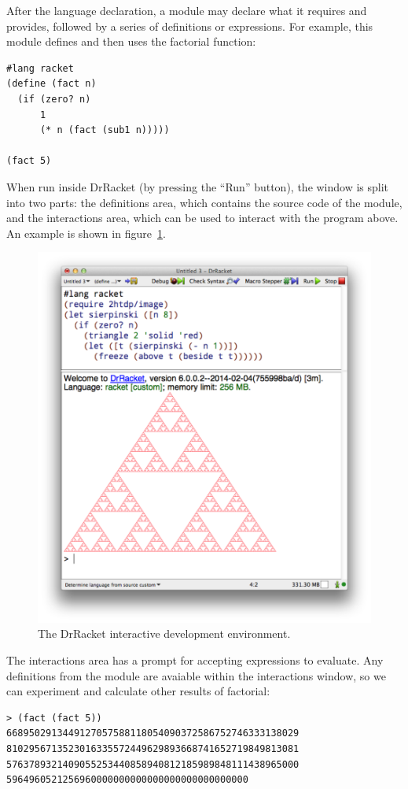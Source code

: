 After the language declaration, a module may declare what it requires
and provides, followed by a series of definitions or expressions.
For example, this module defines and then uses the factorial function:
\begin{verbatim}
#lang racket
(define (fact n)
  (if (zero? n)
      1
      (* n (fact (sub1 n)))))

(fact 5)
\end{verbatim}

When run inside DrRacket (by pressing the ``Run'' button), the window
is split into two parts: the definitions area, which contains the
source code of the module, and the interactions area, which can be
used to interact with the program above.  An example is shown in
figure~\ref{fig:drracket}.
\begin{figure}
\begin{center}
\includegraphics[width=5in]{figs/drracket}
\end{center}
\caption{The DrRacket interactive development environment.}
\label{fig:drracket}
\end{figure}


The interactions area has a prompt for accepting expressions to
evaluate.  Any definitions from the module are avaiable within the
interactions window, so we can experiment and calculate other results
of factorial:
\begin{verbatim}
> (fact (fact 5))
6689502913449127057588118054090372586752746333138029
8102956713523016335572449629893668741652719849813081
5763789321409055253440858940812185989848111438965000
5964960521256960000000000000000000000000000
\end{verbatim}

